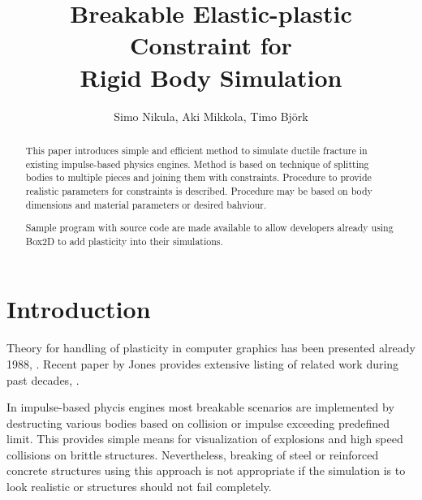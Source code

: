 \documentclass{jcgt}
\begin{document}
\title{Breakable Elastic-plastic Constraint for\\Rigid Body Simulation}

\author
       {Simo Nikula,  Aki Mikkola, Timo Björk\\\lut
       }


\maketitle
\thispagestyle{firstpagestyle}

\begin{abstract}
\small
This paper introduces simple and efficient method to simulate ductile fracture in existing 
impulse-based physics engines.
Method is based on technique of splitting bodies to multiple pieces and joining them with constraints.
Procedure to provide realistic parameters for constraints is described.
Procedure may be based on body dimensions and material parameters or desired bahviour.

Sample program with source code are made available to allow developers already using 
Box2D to add plasticity into their simulations.
\end{abstract}



\section{Introduction}
\label{sec:introduction}

Theory for handling of plasticity in computer graphics has been presented already 1988, \cite{cg1988}. 
Recent paper by Jones  provides extensive listing of related work during past decades, \cite{Jones:2016:EPD}.

In impulse-based phycis engines most breakable scenarios  are implemented by destructing various bodies based on collision
or impulse exceeding predefined limit. This provides simple means for visualization of explosions and high speed collisions 
on brittle structures.  
Nevertheless, breaking of steel or reinforced concrete structures using this approach 
is not appropriate if the simulation is to look realistic or structures should not fail completely.
\end{document}
